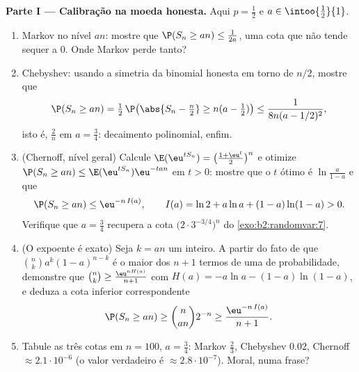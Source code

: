 \begin{problem}
\medskip
\noindent\textbf{Parte I --- Calibração na moeda honesta.}
Aqui $p = \frac12$ e $a \in \intoo{\frac12}{1}$.
\begin{enumerate}
  \item Markov no nível $an$: mostre que $\P(S_n \geq an) \leq
        \frac1{2a}$, uma cota que não tende sequer a $0$.
        Onde Markov perde tanto?
  \item Chebyshev: usando a simetria da binomial honesta
        em torno de $n/2$, mostre que
        \[
        \P(S_n \geq an) = \tfrac12\,
        \P\bigl(\abs{S_n - \tfrac n2} \geq n(a -
        \tfrac12)\bigr)
        \leq \frac{1}{8n(a - 1/2)^2},
        \]
        isto é, $\frac2n$ em $a = \frac34$: decaimento polinomial,
        enfim.
  \item (Chernoff, nível geral) Calcule
        $\E(\eu^{tS_n}) = \bigl(\frac{1 + \eu^t}2\bigr)^n$ e
        otimize $\P(S_n \geq an) \leq
        \E(\eu^{tS_n})\eu^{-tan}$ em $t > 0$: mostre que o
        $t$ ótimo é $\ln\frac{a}{1-a}$ e que
        \[
        \P(S_n \geq an) \leq \eu^{-n\,I(a)},
        \qquad
        I(a) = \ln 2 + a\ln a + (1-a)\ln(1-a) > 0 .
        \]
        Verifique que $a = \frac34$ recupera a cota
        $\bigl(2\cdot3^{-3/4}\bigr)^n$ do
        \cref{exo:b2:randomvar:7}.
  \item (O expoente é exato) Seja $k = an$ um inteiro.
        A partir do fato de que $\binom nk a^k(1-a)^{n-k}$ é o
        maior dos $n + 1$ termos de uma  de
        probabilidade, demonstre que $\binom nk \geq
        \frac{\eu^{nH(a)}}{n+1}$ com $H(a) = -a\ln a -
        (1-a)\ln(1-a)$, e deduza a cota inferior correspondente
        \[
        \P(S_n \geq an) \geq \binom{n}{an}2^{-n}
        \geq \frac{\eu^{-n\,I(a)}}{n + 1} .
        \]
  \item Tabule as três cotas em $n = 100$, $a =
        \frac34$: Markov $\frac23$, Chebyshev $0.02$,
        Chernoff $\approx 2.1\cdot10^{-6}$ (o valor verdadeiro é
        $\approx 2.8\cdot10^{-7}$). Moral, numa frase?
\end{enumerate}


\end{problem}
